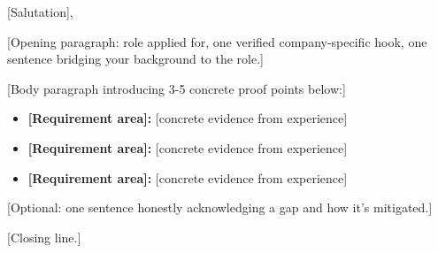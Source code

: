 \documentclass[11pt,a4paper]{article}
\begin{document}


[Salutation],

[Opening paragraph: role applied for, one verified company-specific hook, one sentence bridging your background to the role.]

[Body paragraph introducing 3-5 concrete proof points below:]

\begin{itemize}
    \item \textbf{[Requirement area]:} [concrete evidence from experience]
    \item \textbf{[Requirement area]:} [concrete evidence from experience]
    \item \textbf{[Requirement area]:} [concrete evidence from experience]
\end{itemize}

[Optional: one sentence honestly acknowledging a gap and how it's mitigated.]

[Closing line.]

\begin{flushright}
\end{flushright}
\end{document}

